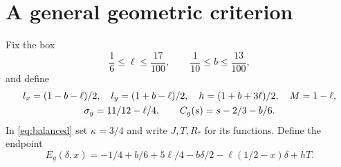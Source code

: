 \section{A general geometric criterion}\label{sec:geometry}
Fix the box
\begin{equation}\label{eq:geobox}
 \frac16\le\ell\le\frac{17}{100},\qquad
 \frac1{10}\le b\le\frac{13}{100},
\end{equation}
and define
\begin{gather}\label{eq:geometry}
 l_x=(1-b-\ell)/2,\quad l_y=(1+b-\ell)/2,\quad
 h=(1+b+3\ell)/2,\quad M=1-\ell,\\
 \sigma_g=11/12-\ell/4,\qquad C_g(s)=s-2/3-b/6.\notag
\end{gather}
In \eqref{eq:balanced} set $\kappa=3/4$ and write $J,T,R_*$ for its functions. Define the endpoint
\begin{equation}\label{eq:endpoint}
 E_g(\delta,x)=-1/4+b/6+5\ell/4-b\delta/2
               -\ell(1/2-x)\delta+hT.
\end{equation}

